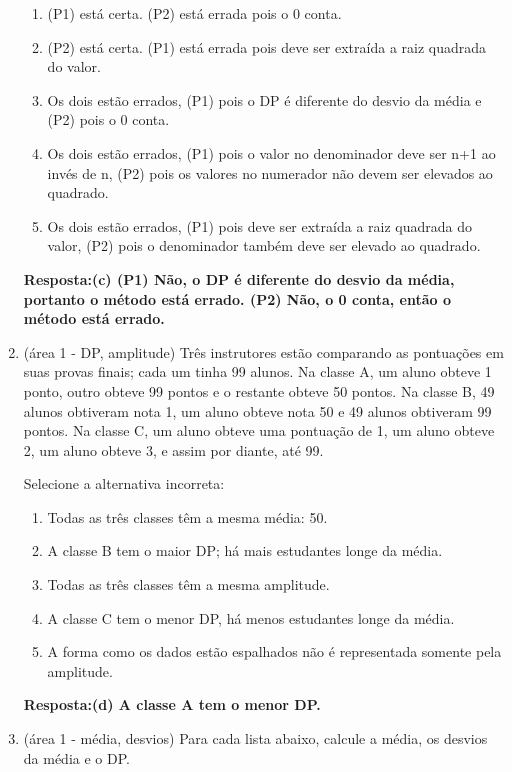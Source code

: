 \documentclass[12pt]{article}\documentclass[brazilian,12pt,a4paper,final]{article}
\begin{document}
\begin{enumerate}
\begin{enumerate}
    \item (P1) está certa. (P2) está errada pois o 0 conta.
    \item (P2) está certa. (P1) está errada pois deve ser extraída a raiz quadrada do valor.
    \item Os dois estão errados, (P1) pois o DP é diferente do desvio da média e (P2) pois o 0 conta.
    \item Os dois estão errados, (P1) pois o valor no denominador deve ser n+1 ao invés de n, (P2) pois os valores no numerador não devem ser elevados ao quadrado.
    \item Os dois estão errados, (P1) pois deve ser extraída a raiz quadrada do valor, (P2) pois o denominador também deve ser elevado ao quadrado.
    
\end{enumerate}
\textbf{Resposta:(c)
(P1) Não, o DP é diferente do desvio da média, portanto o método está
errado. (P2) Não, o 0 conta, então o método está errado.
}

\item (área 1 - DP, amplitude) Três instrutores estão comparando as pontuações em suas provas  finais; cada um tinha 99 alunos. Na
classe A, um aluno obteve 1 ponto, outro obteve 99 pontos e o restante obteve 50 pontos.
Na classe B, 49 alunos obtiveram nota 1, um aluno obteve nota 50 e 49 alunos obtiveram 99 pontos. Na classe C, um aluno obteve uma pontuação de 1, um aluno obteve 2, um aluno obteve 3, e assim por diante, até 99.

Selecione a alternativa incorreta:
\begin{enumerate}
    \item Todas as três classes têm a mesma média: 50.
    \item A classe B tem o maior DP; há mais estudantes longe da média.
    \item Todas as três classes têm a mesma amplitude.
    \item A classe C tem o menor DP, há menos estudantes longe da média.
    \item A forma como os dados estão espalhados não é representada somente pela amplitude.
\end{enumerate}

\textbf{Resposta:(d) A classe A tem o menor DP.}

\item (área 1 - média, desvios) Para cada lista abaixo, calcule a média, os desvios da média e o DP.


\end{enumerate}
\end{document}
